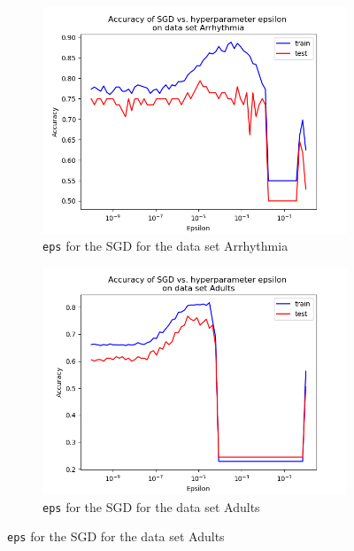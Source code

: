 \documentclass{article}
\begin{document}
\begin{figure}[H]
	\begin{subfigure}[t]{0.45\linewidth}
		\includegraphics[width=\linewidth]{arrhythmia_sgd_eps.png}
		\caption{\texttt{eps} for the SGD for the data set Arrhythmia}
	\end{subfigure}
	\begin{subfigure}[t]{0.45\linewidth}
		\includegraphics[width=\linewidth]{adults_sgd_eps.png}
		\caption{\texttt{eps} for the SGD for the data set Adults}
	\end{subfigure}


\end{figure}
\end{document}
